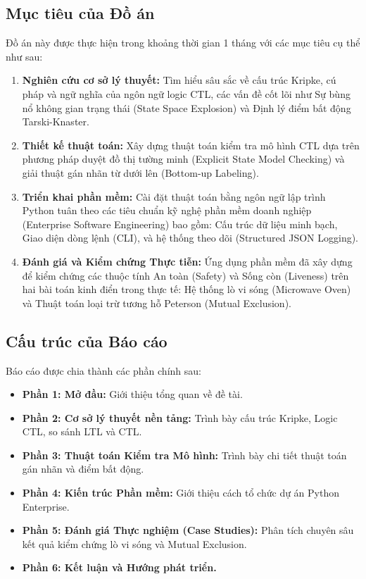 \documentclass[12pt,a4paper]{article}
\begin{document}
\subsection{Mục tiêu của Đồ án}
Đồ án này được thực hiện trong khoảng thời gian 1 tháng với các mục tiêu cụ thể như sau:
\begin{enumerate}
    \item \textbf{Nghiên cứu cơ sở lý thuyết:} Tìm hiểu sâu sắc về cấu trúc Kripke, cú pháp và ngữ nghĩa của ngôn ngữ logic CTL, các vấn đề cốt lõi như Sự bùng nổ không gian trạng thái (State Space Explosion) và Định lý điểm bất động Tarski-Knaster.
    \item \textbf{Thiết kế thuật toán:} Xây dựng thuật toán kiểm tra mô hình CTL dựa trên phương pháp duyệt đồ thị tường minh (Explicit State Model Checking) và giải thuật gán nhãn từ dưới lên (Bottom-up Labeling).
    \item \textbf{Triển khai phần mềm:} Cài đặt thuật toán bằng ngôn ngữ lập trình Python tuân theo các tiêu chuẩn kỹ nghệ phần mềm doanh nghiệp (Enterprise Software Engineering) bao gồm: Cấu trúc dữ liệu minh bạch, Giao diện dòng lệnh (CLI), và hệ thống theo dõi (Structured JSON Logging).
    \item \textbf{Đánh giá và Kiểm chứng Thực tiễn:} Ứng dụng phần mềm đã xây dựng để kiểm chứng các thuộc tính An toàn (Safety) và Sống còn (Liveness) trên hai bài toán kinh điển trong thực tế: Hệ thống lò vi sóng (Microwave Oven) và Thuật toán loại trừ tương hỗ Peterson (Mutual Exclusion).
\end{enumerate}

\subsection{Cấu trúc của Báo cáo}
Báo cáo được chia thành các phần chính sau:
\begin{itemize}
    \item \textbf{Phần 1: Mở đầu:} Giới thiệu tổng quan về đề tài.
    \item \textbf{Phần 2: Cơ sở lý thuyết nền tảng:} Trình bày cấu trúc Kripke, Logic CTL, so sánh LTL và CTL.
    \item \textbf{Phần 3: Thuật toán Kiểm tra Mô hình:} Trình bày chi tiết thuật toán gán nhãn và điểm bất động.
    \item \textbf{Phần 4: Kiến trúc Phần mềm:} Giới thiệu cách tổ chức dự án Python Enterprise.
    \item \textbf{Phần 5: Đánh giá Thực nghiệm (Case Studies):} Phân tích chuyên sâu kết quả kiểm chứng lò vi sóng và Mutual Exclusion.
    \item \textbf{Phần 6: Kết luận và Hướng phát triển.}
\end{itemize}
\end{document}

